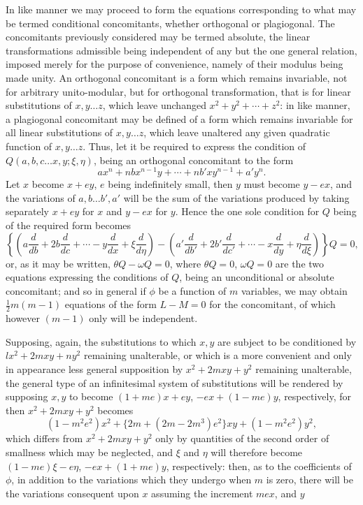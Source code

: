\documentclass[11pt]{article}
\newcommand{\sourcepage}[1]{\marginpar{\scriptsize p.~#1}}
\begin{document}
{{\sourcepage{357}
In like manner we may proceed to form the equations corresponding to what may be termed conditional concomitants, whether orthogonal or plagiogonal. The concomitants previously considered may be termed absolute, the linear transformations admissible being independent of any but the one general relation, imposed merely for the purpose of convenience, namely of their modulus being made unity. An orthogonal concomitant is a form which remains invariable, not for arbitrary unito-modular, but for orthogonal transformation, that is for linear substitutions of $x,y\ldots z$, which leave unchanged $x^2+y^2+\cdots+z^2$: in like manner, a plagiogonal concomitant may be defined of a form which remains invariable for all linear substitutions of $x,y\ldots z$, which leave unaltered any given quadratic function of $x,y\ldots z$. Thus, let it be required to express the condition of $Q(a,b,c\ldots x,y;\xi,\eta)$, being an orthogonal concomitant to the form
\[
ax^n+nbx^{n-1}y+\cdots+nb'xy^{n-1}+a'y^n.
\]
Let $x$ become $x+ey$, $e$ being indefinitely small, then $y$ must become $y-ex$, and the variations of $a,b\ldots b',a'$ will be the sum of the variations produced by taking separately $x+ey$ for $x$ and $y-ex$ for $y$. Hence the one sole condition for $Q$ being of the required form becomes
\[
\left\{
\left(a\frac{d}{db}+2b\frac{d}{dc}+\cdots-y\frac{d}{dx}+\xi\frac{d}{d\eta}\right)
-
\left(a'\frac{d}{db'}+2b'\frac{d}{dc'}+\cdots-x\frac{d}{dy}+\eta\frac{d}{d\xi}\right)
\right\}Q=0,
\]
or, as it may be written, $\theta Q-\omega Q=0$, where $\theta Q=0$, $\omega Q=0$ are the two equations expressing the conditions of $Q$, being an unconditional or absolute concomitant; and so in general if $\phi$ be a function of $m$ variables, we may obtain $\frac12m(m-1)$ equations of the form $L-M=0$ for the concomitant, of which however $(m-1)$ only will be independent.

Supposing, again, the substitutions to which $x,y$ are subject to be conditioned by $lx^2+2mxy+ny^2$ remaining unalterable, or which is a more convenient and only in appearance less general supposition by $x^2+2mxy+y^2$ remaining unalterable, the general type of an infinitesimal system of substitutions will be rendered by supposing $x,y$ to become $(1+me)x+ey$, $-ex+(1-me)y$, respectively, for then $x^2+2mxy+y^2$ becomes
\[
(1-m^2e^2)x^2+\{2m+(2m-2m^3)e^2\}xy+(1-m^2e^2)y^2,
\]
which differs from $x^2+2mxy+y^2$ only by quantities of the second order of smallness which may be neglected, and $\xi$ and $\eta$ will therefore become $(1-me)\xi-e\eta$, $-ex+(1+me)y$, respectively: then, as to the coefficients of $\phi$, in addition to the variations which they undergo when $m$ is zero, there will be the variations consequent upon $x$ assuming the increment $mex$, and $y$

}}
\end{document}
